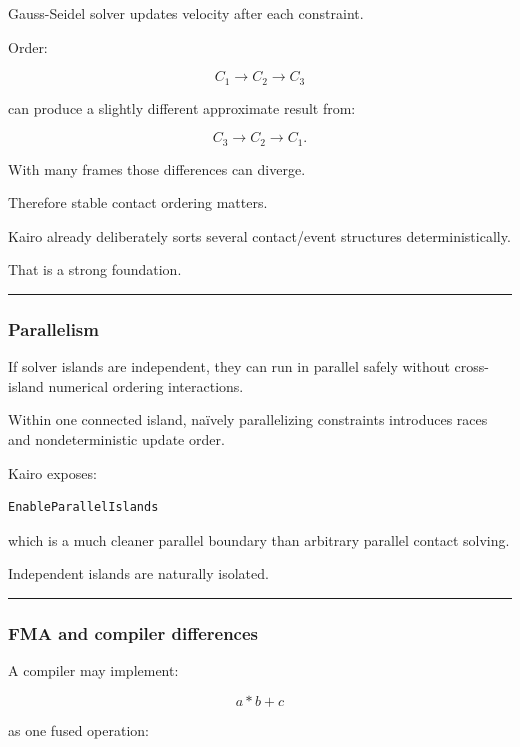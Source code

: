 Gauss-Seidel solver updates velocity after each constraint.

Order:

\[
C_1\rightarrow C_2\rightarrow C_3
\]

can produce a slightly different approximate result from:

\[
C_3\rightarrow C_2\rightarrow C_1.
\]

With many frames those differences can diverge.

Therefore stable contact ordering matters.

Kairo already deliberately sorts several contact/event structures deterministically.

That is a strong foundation.

\begin{center}\rule{0.5\linewidth}{0.5pt}\end{center}

\subsubsection{Parallelism}\label{parallelism}

If solver islands are independent, they can run in parallel safely without cross-island numerical ordering interactions.

Within one connected island, naïvely parallelizing constraints introduces races and nondeterministic update order.

Kairo exposes:

\begin{verbatim}
EnableParallelIslands
\end{verbatim}

which is a much cleaner parallel boundary than arbitrary parallel contact solving.

Independent islands are naturally isolated.

\begin{center}\rule{0.5\linewidth}{0.5pt}\end{center}

\subsubsection{FMA and compiler differences}\label{fma-and-compiler-differences}

A compiler may implement:

\[
a*b+c
\]

as one fused operation:

